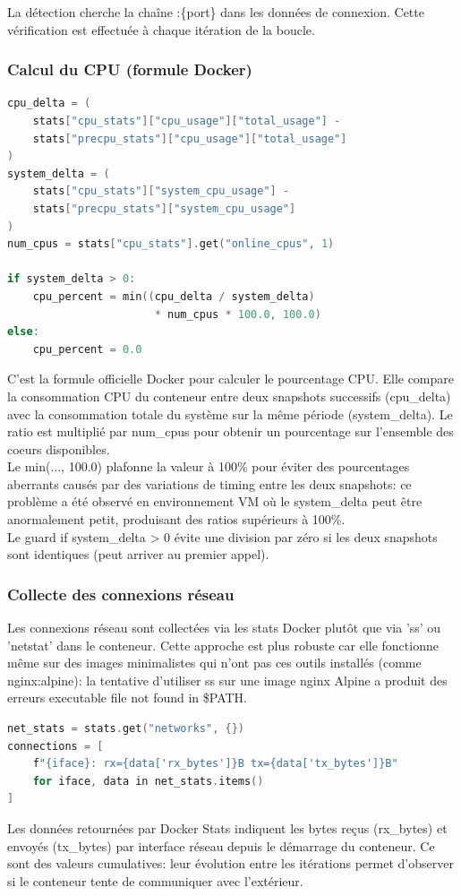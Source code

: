 La détection cherche la chaîne :\{port\} dans les données de connexion. Cette vérification est effectuée à chaque itération de la boucle. \\
\subsubsection{Calcul du CPU (formule Docker)}
\begin{lstlisting}[language=go, caption=Calcul du cpu]
cpu_delta = (
    stats["cpu_stats"]["cpu_usage"]["total_usage"] -
    stats["precpu_stats"]["cpu_usage"]["total_usage"]
)
system_delta = (
    stats["cpu_stats"]["system_cpu_usage"] -
    stats["precpu_stats"]["system_cpu_usage"]
)
num_cpus = stats["cpu_stats"].get("online_cpus", 1)

if system_delta > 0:
    cpu_percent = min((cpu_delta / system_delta) 
                       * num_cpus * 100.0, 100.0)
else:
    cpu_percent = 0.0
\end{lstlisting}
C'est la formule officielle Docker pour calculer le pourcentage CPU. Elle compare la consommation CPU du conteneur entre deux snapshots successifs (cpu\_delta) avec la consommation totale du système sur la même période (system\_delta). Le ratio est multiplié par num\_cpus pour obtenir un pourcentage sur l'ensemble des coeurs disponibles. \\

Le min(..., 100.0) plafonne la valeur à 100\% pour éviter des pourcentages aberrants causés par des variations de timing entre les deux snapshots: ce problème a été observé en environnement VM où le system\_delta peut être anormalement petit, produisant des ratios supérieurs à 100\%. \\

Le guard if system\_delta > 0 évite une division par zéro si les deux snapshots sont identiques (peut arriver au premier appel).

\subsubsection{Collecte des connexions réseau}
Les connexions réseau sont collectées via les stats Docker plutôt que via 'ss' ou 'netstat' dans le conteneur. Cette approche est plus robuste car elle fonctionne même sur des images minimalistes qui n'ont pas ces outils installés (comme nginx:alpine): la tentative d'utiliser ss sur une image nginx Alpine a produit des erreurs executable file not found in \$PATH.
\newpage
\begin{lstlisting}[language=go, caption=Calcul du cpu]
net_stats = stats.get("networks", {})
connections = [
    f"{iface}: rx={data['rx_bytes']}B tx={data['tx_bytes']}B"
    for iface, data in net_stats.items()
]
\end{lstlisting}
Les données retournées par Docker Stats indiquent les bytes reçus (rx\_bytes) et envoyés (tx\_bytes) par interface réseau depuis le démarrage du conteneur. Ce sont des valeurs cumulatives: leur évolution entre les itérations permet d'observer si le conteneur tente de communiquer avec l'extérieur. \\
